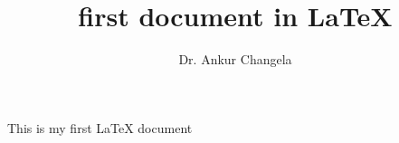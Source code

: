 \documentclass[a4paper,12pt]{article}
\title{first document in LaTeX}
\author{Dr. Ankur Changela}
\begin{document}
\maketitle
This is my first LaTeX document
\end{document}
